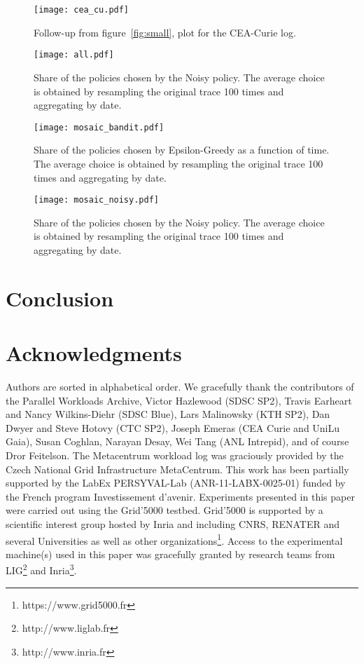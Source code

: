 \documentclass[sigconf]{acmart}
\begin{document}
\begin{figure}[ht]
  \centering
  \texttt{[image: cea\_cu.pdf]}

  \caption{Follow-up from figure~\ref{fig:small}, plot for the CEA-Curie log.}

  \label{fig:follow}
\end{figure}

\begin{figure}[ht]
  \centering
  \texttt{[image: all.pdf]}
  \caption{Share of the policies chosen by the Noisy policy. The average
  choice is obtained by resampling the original trace 100 times and
  aggregating by date.}
  \label{fig:all}
\end{figure}

\begin{figure}[ht]
  \centering
  \texttt{[image: mosaic\_bandit.pdf]}
  \caption{Share of the policies chosen by Epsilon-Greedy as a function of time.
  The average choice is obtained by resampling the original trace 100 times and
  aggregating by date.}
  \label{fig:mosb}
\end{figure}

\begin{figure}[ht]
  \centering
  \texttt{[image: mosaic\_noisy.pdf]}
  \caption{Share of the policies chosen by the Noisy policy. The average
  choice is obtained by resampling the original trace 100 times and
  aggregating by date.}
  \label{fig:mosn}
\end{figure}

\section{Conclusion}
\label{sec:ccl}

\section*{Acknowledgments}

Authors are sorted in alphabetical order. We gracefully thank the contributors
of the Parallel Workloads Archive, Victor Hazlewood (SDSC SP2), Travis Earheart
and Nancy Wilkins-Diehr (SDSC Blue), Lars Malinowsky (KTH SP2), Dan Dwyer and
Steve Hotovy (CTC SP2), Joseph Emeras (CEA Curie and UniLu Gaia), Susan
Coghlan, Narayan Desay, Wei Tang (ANL Intrepid), and of course Dror Feitelson.
The Metacentrum workload log was graciously provided by the Czech National Grid
Infrastructure MetaCentrum. This work has been partially supported by the LabEx
PERSYVAL-Lab (ANR-11-LABX-0025-01) funded by the French program Investissement
d'avenir. Experiments presented in this paper were carried out using the
Grid'5000 testbed. Grid'5000 is supported by a scientific interest group hosted
by Inria and including CNRS, RENATER and several Universities as well as other
organizations\footnote{https://www.grid5000.fr}.  Access to the experimental
machine(s) used in this paper was gracefully granted by research teams from
LIG\footnote{http://www.liglab.fr} and Inria\footnote{http://www.inria.fr}.
\end{document}

